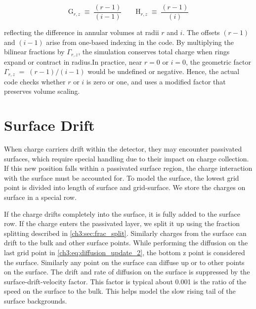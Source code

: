 \[
\text{G}_{r,z} \;\equiv\; \frac{(r-1)}{(i-1)}
\qquad
\text{H}_{r,z} \;\equiv\; \frac{(r-1)}{(i)}
\] 


reflecting the difference in annular volumes at radii $r$ and $i$.
The offsets $(r-1)$ and $(i-1)$ arise from one-based indexing in the code. By multiplying the bilinear fractions by $\Gamma_{r,z}$, the simulation conserves total charge when rings expand or contract in radius.In practice, near $r=0$ or $i=0$, the geometric factor $\Gamma_{r,z} \;=\; (r-1)/(i-1)$ would be undefined or negative. Hence, the actual code checks whether $r$ or $i$ is zero or one, and uses a modified factor that preserves volume scaling. 


\section{Surface Drift}

When charge carriers drift within the detector, they may encounter passivated surfaces, which require special handling due to their impact on charge collection. If this new position falls within a passivated surface region, the charge interaction with the surface must be accounted for. To model the surface, the lowest grid point is divided into length of surface and grid-surface. We store the charges on surface in a special row. 

If the charge drifts completely into the surface, it is fully added to the surface row. If the charge enters the passivated layer, we split it up using the fraction splitting described in \ref{ch3:sec:frac_split}. Similarly charges from the surface can drift to the bulk and other surface points. While performing the diffusion on the last grid point in \ref{ch3:eq:diffusion_update_2}, the bottom z point is considered the surface. Similarly any point on the surface can diffuse up or to other points on the surface. The drift and rate of diffusion on the surface is suppressed by the surface-drift-velocity factor. This factor is typical about 0.001 is the ratio of the speed on the surface to the bulk. This helps model the slow rising tail of the surface backgrounds.


